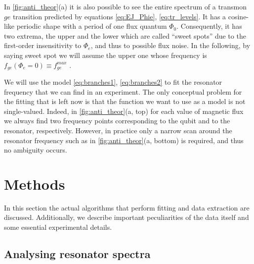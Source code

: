 \documentclass[%
 aip,
 amsmath,amssymb,
 reprint,%
]{revtex4-1}
\begin{document}
In \autoref{fig:anti_theor}(a) it is also possible to see the entire spectrum of a transmon $ge$ transition predicted by equations \eqref{eq:EJ_Phie}, \eqref{eq:tr_levels}. It has a cosine-like periodic shape with a period of one flux quantum $\Phi_0$. Consequently, it has two extrema, the upper and the lower which are called ``sweet spots'' due to the first-order insensitivity to $\Phi_e$, and thus to possible flux noise. In the following, by saying sweet spot we will assume the upper one whose frequency is $f_{ge}(\Phi_e = 0) \equiv f^{max}_{ge}$ .

We will use the model \eqref{eq:branches1}, \eqref{eq:branches2} to fit the resonator frequency that we can find in an experiment. The only conceptual problem for the fitting that is left now is that the function we want to use as a model is not single-valued. Indeed, in \autoref{fig:anti_theor}(a, top) for each value of magnetic flux we always find two frequency points corresponding to the qubit and to the resonator, respectively. However, in practice only a narrow scan around the resonator frequency such as in \autoref{fig:anti_theor}(a, bottom) is required, and thus no ambiguity occurs. 


\section{Methods}

In this section the actual algorithms that perform fitting and data extraction are discussed. Additionally, we describe important peculiarities of the data itself and some essential experimental details.

\subsection{Analysing resonator spectra}
\end{document}
